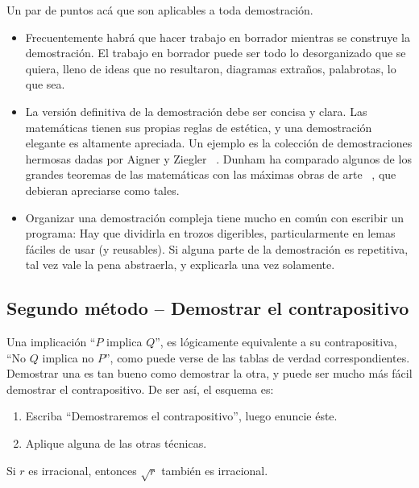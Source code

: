   Un par de puntos acá que son aplicables a toda demostración.
  \begin{itemize}
  \item
    Frecuentemente habrá que hacer trabajo en borrador
    mientras se construye la demostración.
    El trabajo en borrador
    puede ser todo lo desorganizado que se quiera,
    lleno de ideas que no resultaron,
    diagramas extraños,
    palabrotas,
    lo que sea.
  \item
    La versión definitiva
    de la demostración debe ser concisa y clara.
    Las matemáticas tienen sus propias reglas de estética,
    y una demostración elegante es altamente apreciada.
    Un ejemplo es la colección de demostraciones hermosas
    dadas por Aigner y Ziegler~%
      \cite{aigner14:_proof_the_book}.
    Dunham ha comparado
    algunos de los grandes teoremas de las matemáticas
    con las máximas obras de arte~%
      \cite{dunham90:_journey_genius,dunham97:_mathem_univer},
    que debieran apreciarse como tales.
  \item
    Organizar una demostración compleja tiene mucho en común
    con escribir un programa:
    Hay que dividirla en trozos digeribles,
    particularmente en lemas fáciles de usar%
    (y reusables).
    Si alguna parte de la demostración es repetitiva,
    tal vez vale la pena abstraerla,
    y explicarla una vez solamente.
  \end{itemize}

\subsection{Segundo método -- Demostrar el contrapositivo}
\label{sec:implicancias-2}

  Una implicación ``\(P\) implica \(Q\)'',
  es lógicamente equivalente a su contrapositiva,
  ``No \(Q\) implica no \(P\)'',
  como puede verse de las tablas de verdad correspondientes.
  Demostrar una es tan bueno como demostrar la otra,
  y puede ser mucho más fácil demostrar el contrapositivo.
  De ser así,
  el esquema es:
  \begin{enumerate}
  \item
    Escriba ``Demostraremos el contrapositivo'',
    luego enuncie éste.
  \item
    Aplique alguna de las otras técnicas.
  \end{enumerate}

  \begin{proposition}
    Si \(r\) es irracional,
    entonces \(\sqrt{r}\) también es irracional.
  \end{proposition}

